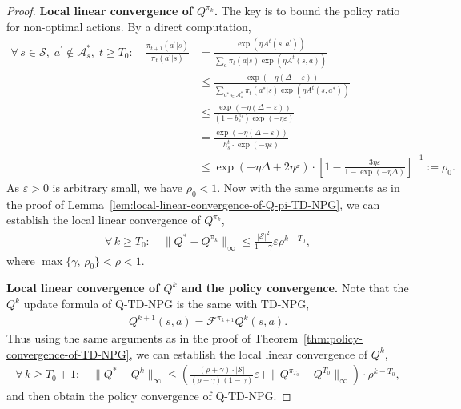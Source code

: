 \documentclass[10pt]{article}
\newcommand{\calA}{\mathcal{A}}
\newcommand{\calS}{\mathcal{S}}
\newcommand{\calF}{\mathcal{F}}
\newcommand{\ls}{\left}
\newcommand{\rs}{\right}
\theoremstyle{plain}
\theoremstyle{definition}
\begin{document}
\begin{proof}
    \textbf{Local linear convergence of $Q^{\pi_k}$.} The key is to bound the policy ratio for non-optimal actions. By a direct computation,
    \begin{align*}
        \forall\, s\in\calS, \; a^\prime \not\in\calA^*_s, \; t\geq T_0: \quad \frac{\pi_{t+1}(a^\prime|s)}{\pi_t(a^\prime|s)} &= \frac{\exp (\eta A^t(s, a^\prime))}{\sum_a \pi_t(a|s) \exp(\eta A^t(s,a))} \\
        &\leq \frac{\exp(-\eta (\Delta - \varepsilon))}{\sum_{a^* \in\calA^*_s} \pi_t(a^*|s) \exp (\eta A^t(s,a^*))} \\
        &\leq \frac{\exp(-\eta (\Delta - \varepsilon))}{(1-b_s^{\pi_t}) \exp(-\eta\varepsilon)} \\
        &= \frac{\exp(-\eta (\Delta - \varepsilon))}{h_s^t \cdot \exp(-\eta\varepsilon)} \\
        &\leq \exp (-\eta\Delta + 2\eta\varepsilon) \cdot \ls[ 1 - \frac{3\eta\varepsilon}{1-\exp(-\eta\Delta)} \rs]^{-1} := \rho_0.
    \end{align*}
    As $\varepsilon > 0$ is arbitrary small, we have $\rho_0 < 1$. Now with the same arguments as in the proof of Lemma~\ref{lem:local-linear-convergence-of-Q-pi-TD-NPG}, we can establish the local linear convergence of $Q^{\pi_k}$,
    \begin{align*}
        \forall\, k \geq T_0: \quad \| Q^* - Q^{\pi_k} \|_\infty \leq \frac{|\calS|^2}{1-\gamma} \varepsilon \rho^{k-T_0},
    \end{align*}
    where $\max\{ \gamma, \, \rho_0 \} < \rho < 1$.

    \textbf{Local linear convergence of $Q^k$ and the policy convergence. } Note that the $Q^k$ update formula of Q-TD-NPG is the same with TD-NPG,
    \begin{align*}
        Q^{k+1}(s,a) = \calF^{\pi_{k+1}} Q^k(s,a).
    \end{align*}
    Thus using the same arguments as in the proof of Theorem~\ref{thm:policy-convergence-of-TD-NPG}, we can establish the local linear convergence of $Q^k$,
    \begin{align*}
        \forall\, k \geq T_0 + 1 : \quad \| Q^* - Q^k \|_\infty \leq \ls( \frac{(\rho+\gamma) \cdot |\calS|}{(\rho-\gamma) (1-\gamma)} \varepsilon + \| Q^{\pi_{T_0}} - Q^{T_0} \|_\infty \rs) \cdot \rho ^{k - T_0},
    \end{align*}
and then obtain the policy convergence of Q-TD-NPG.
\end{proof}
\end{document}
